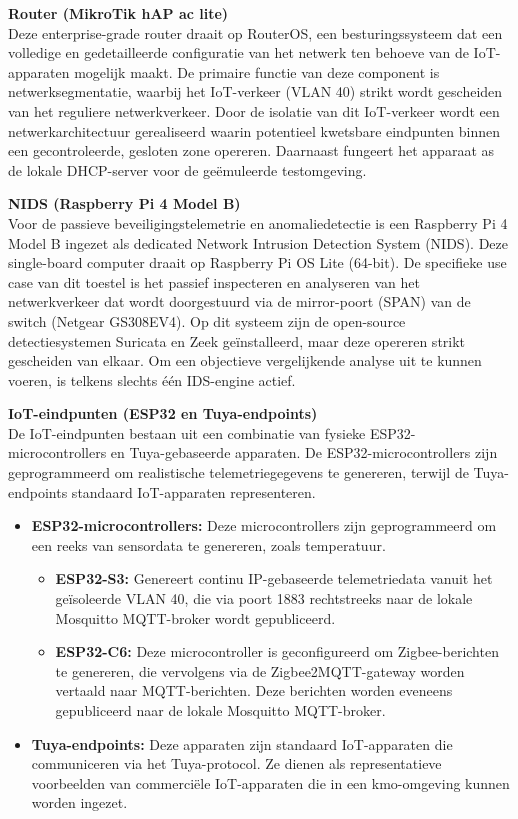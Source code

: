 \textbf{Router (MikroTik hAP ac lite)} \\
Deze enterprise-grade router draait op RouterOS, een besturingssysteem dat een volledige en gedetailleerde configuratie van het netwerk ten behoeve van de IoT-apparaten mogelijk maakt. De primaire functie van deze component is netwerksegmentatie, waarbij het IoT-verkeer (VLAN 40) strikt wordt gescheiden van het reguliere netwerkverkeer. Door de isolatie van dit IoT-verkeer wordt een netwerkarchitectuur gerealiseerd waarin potentieel kwetsbare eindpunten binnen een gecontroleerde, gesloten zone opereren. Daarnaast fungeert het apparaat as de lokale DHCP-server voor de geëmuleerde testomgeving.
\vspace{1em}

\textbf{NIDS (Raspberry Pi 4 Model B)} \\
Voor de passieve beveiligingstelemetrie en anomaliedetectie is een Raspberry Pi 4 Model B ingezet als dedicated Network Intrusion Detection System (NIDS). Deze single-board computer draait op Raspberry Pi OS Lite (64-bit). De specifieke use case van dit toestel is het passief inspecteren en analyseren van het netwerkverkeer dat wordt doorgestuurd via de mirror-poort (SPAN) van de switch (Netgear GS308EV4). Op dit systeem zijn de open-source detectiesystemen Suricata en Zeek geïnstalleerd, maar deze opereren strikt gescheiden van elkaar. Om een objectieve vergelijkende analyse uit te kunnen voeren, is telkens slechts één IDS-engine actief.
\vspace{1em}

\textbf{IoT-eindpunten (ESP32 en Tuya-endpoints)} \\
De IoT-eindpunten bestaan uit een combinatie van fysieke ESP32-microcontrollers en Tuya-gebaseerde apparaten. De ESP32-microcontrollers zijn geprogrammeerd om realistische telemetriegegevens te genereren, terwijl de Tuya-endpoints standaard IoT-apparaten representeren.

\begin{itemize}
    \item \textbf{ESP32-microcontrollers:} Deze microcontrollers zijn geprogrammeerd om een reeks van sensordata te genereren, zoals temperatuur. 
    \begin{itemize}
        \item \textbf{ESP32-S3:} Genereert continu IP-gebaseerde telemetriedata vanuit het geïsoleerde VLAN 40, die via poort 1883 rechtstreeks naar de lokale Mosquitto MQTT-broker wordt gepubliceerd.
        \item \textbf{ESP32-C6:} Deze microcontroller is geconfigureerd om Zigbee-berichten te genereren, die vervolgens via de Zigbee2MQTT-gateway worden vertaald naar MQTT-berichten. Deze berichten worden eveneens gepubliceerd naar de lokale Mosquitto MQTT-broker.
    \end{itemize}
    \item \textbf{Tuya-endpoints:} Deze apparaten zijn standaard IoT-apparaten die communiceren via het Tuya-protocol. Ze dienen als representatieve voorbeelden van commerciële IoT-apparaten die in een kmo-omgeving kunnen worden ingezet.
\end{itemize}


